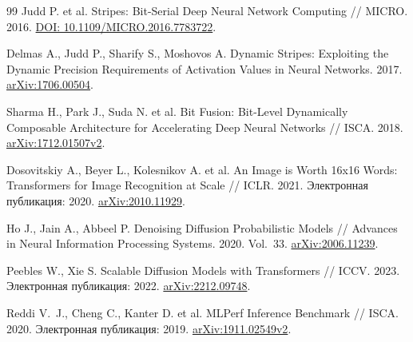\begin{thebibliography}{99}
Judd P. et al.
Stripes: Bit-Serial Deep Neural Network Computing // MICRO. 2016.
\href{https://doi.org/10.1109/MICRO.2016.7783722}{DOI: 10.1109/MICRO.2016.7783722}.

Delmas A., Judd P., Sharify S., Moshovos A.
Dynamic Stripes: Exploiting the Dynamic Precision Requirements
of Activation Values in Neural Networks. 2017.
\href{https://arxiv.org/abs/1706.00504}{arXiv:1706.00504}.

Sharma H., Park J., Suda N. et al.
Bit Fusion: Bit-Level Dynamically Composable Architecture for
Accelerating Deep Neural Networks // ISCA. 2018.
\href{https://arxiv.org/abs/1712.01507v2}{arXiv:1712.01507v2}.

Dosovitskiy A., Beyer L., Kolesnikov A. et al.
An Image is Worth 16x16 Words: Transformers for Image Recognition at Scale //
ICLR. 2021. Электронная публикация: 2020.
\href{https://arxiv.org/abs/2010.11929}{arXiv:2010.11929}.

Ho J., Jain A., Abbeel P.
Denoising Diffusion Probabilistic Models //
Advances in Neural Information Processing Systems. 2020. Vol.~33.
\href{https://arxiv.org/abs/2006.11239}{arXiv:2006.11239}.

Peebles W., Xie S.
Scalable Diffusion Models with Transformers // ICCV. 2023.
Электронная публикация: 2022.
\href{https://arxiv.org/abs/2212.09748}{arXiv:2212.09748}.

Reddi V.~J., Cheng C., Kanter D. et al.
MLPerf Inference Benchmark // ISCA. 2020. Электронная публикация: 2019.
\href{https://arxiv.org/abs/1911.02549v2}{arXiv:1911.02549v2}.

\end{thebibliography}
\endgroup
